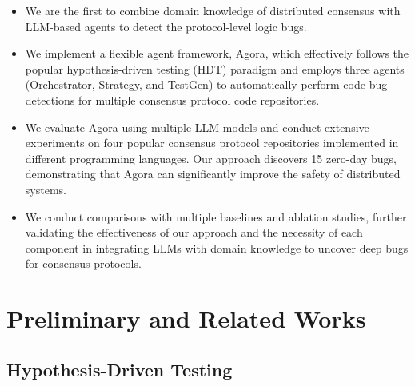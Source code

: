 \documentclass{article}
\theoremstyle{plain}
\theoremstyle{definition}
\theoremstyle{remark}
\newcommand{\consensustester}{Agora\xspace}
\newcommand{\agenta}{Orchestrator\xspace}
\newcommand{\agentb}{Strategy\xspace}
\newcommand{\agentc}{TestGen\xspace}
\begin{document}

\begin{itemize}
\item We are the first to combine domain knowledge of distributed consensus with LLM-based agents to detect the protocol-level logic bugs.

\item We implement a flexible agent framework, \consensustester, which effectively follows the popular hypothesis-driven testing (HDT) paradigm and employs three agents (\agenta, \agentb, and \agentc) to automatically perform code bug detections for multiple consensus protocol code repositories.

\item We evaluate \consensustester using multiple LLM models and conduct extensive experiments on four popular consensus protocol repositories implemented in different programming languages. Our approach discovers 15 zero-day bugs, demonstrating that \consensustester can significantly improve the safety of distributed systems. 

\item We conduct comparisons with multiple baselines and ablation studies, further validating the effectiveness of our approach and the necessity of each component in integrating LLMs with domain knowledge to uncover deep bugs for consensus protocols. %
\end{itemize}



\section{Preliminary and Related Works}
\label{sec:pre}

\subsection{Hypothesis-Driven Testing}

\end{document}
